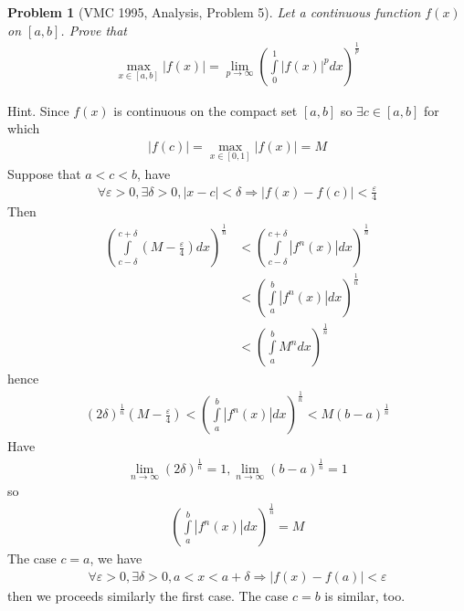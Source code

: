 \documentclass{article}
\newtheorem{problem}{Problem}
\begin{document}
\begin{problem}[VMC 1995, Analysis, Problem 5]
	Let a continuous function $f(x)$ on $[a,b]$. Prove that
	\begin{align}
	\mathop {\max }\limits_{x \in \left[ {a,b} \right]} \left| {f\left( x \right)} \right| = \mathop {\lim }\limits_{p \to \infty } {\left( {\int\limits_0^1 {{{\left| {f\left( x \right)} \right|}^p}} dx} \right)^{\frac{1}{p}}}
	\end{align}
\end{problem}
{\sf Hint.} Since $f(x)$ is continuous on the compact set $[a,b]$ so $\exists c \in \left[ {a,b} \right]$ for which
\begin{align}
	\left| {f\left( c \right)} \right| = \mathop {\max }\limits_{x \in \left[ {0,1} \right]} \left| {f\left( x \right)} \right| = M
\end{align}
Suppose that $a < c < b$, have
\begin{align}
	\forall \varepsilon  > 0,\exists \delta  > 0,\left| {x - c} \right| < \delta  \Rightarrow \left| {f\left( x \right) - f\left( c \right)} \right| < \frac{\varepsilon }{4}
\end{align}
Then 
\begin{align}
	{\left( {\int\limits_{c - \delta }^{c + \delta } {\left( {M - \frac{\varepsilon }{4}} \right)} dx} \right)^{\frac{1}{n}}} &< {\left( {\int\limits_{c - \delta }^{c + \delta } {\left| {{f^n}\left( x \right)} \right|} dx} \right)^{\frac{1}{n}}} \\
	&< {\left( {\int\limits_a^b {\left| {{f^n}\left( x \right)} \right|} dx} \right)^{\frac{1}{n}}} \\
	&< {\left( {\int\limits_a^b {{M^n}} dx} \right)^{\frac{1}{n}}}
\end{align}
hence 
\begin{align}
	{\left( {2\delta } \right)^{\frac{1}{n}}}\left( {M - \frac{\varepsilon }{4}} \right) < {\left( {\int\limits_a^b {\left| {{f^n}\left( x \right)} \right|} dx} \right)^{\frac{1}{n}}} < M{\left( {b - a} \right)^{\frac{1}{n}}}
\end{align}
Have 
\begin{align}
	\mathop {\lim }\limits_{n \to \infty } {\left( {2\delta } \right)^{\frac{1}{n}}} = 1,\mathop {\lim }\limits_{n \to \infty } {\left( {b - a} \right)^{\frac{1}{n}}} = 1
\end{align}
so 
\begin{align}
	{\left( {\int\limits_a^b {\left| {{f^n}\left( x \right)} \right|} dx} \right)^{\frac{1}{n}}} = M
\end{align}
The case $c = a$, we have 
\begin{align}
	\forall \varepsilon  > 0,\exists \delta  > 0,a < x < a + \delta  \Rightarrow \left| {f\left( x \right) - f\left( a \right)} \right| < \varepsilon
\end{align}
then we proceeds similarly the first case. The case $c=b$ is similar, too.
\end{document}
